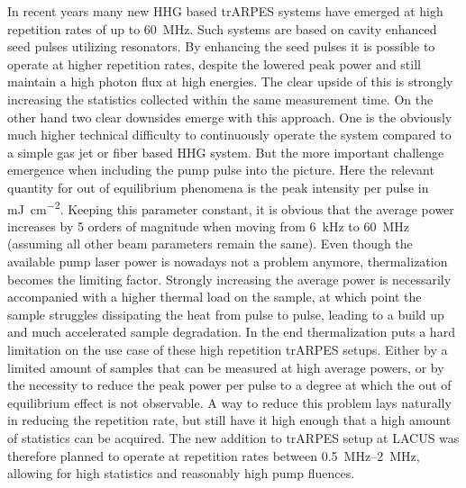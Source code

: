 In recent years many new HHG based trARPES systems have emerged at high repetition rates of up to \qty{60}{\mega\hertz}.
Such systems are based on cavity enhanced seed pulses utilizing resonators.
By enhancing the seed pulses it is possible to operate at higher repetition rates, despite the lowered peak power and still maintain a high photon flux at high energies.
The clear upside of this is strongly increasing the statistics collected within the same measurement time.
On the other hand two clear downsides emerge with this approach.
One is the obviously much higher technical difficulty to continuously operate the system compared to a simple gas jet or fiber based HHG system.
But the more important challenge emergence when including the pump pulse into the picture.
Here the relevant quantity for out of equilibrium phenomena is the peak intensity per pulse in \unit{\milli\joule\per\centi\meter^2}.
Keeping this parameter constant, it is obvious that the average power increases by 5 orders of magnitude when moving from \qty{6}{\kilo\hertz} to \qty{60}{\mega\hertz} (assuming all other beam parameters remain the same).
Even though the available pump laser power is nowadays not a problem anymore, thermalization becomes the limiting factor.
Strongly increasing the average power is necessarily accompanied with a higher thermal load on the sample, at which point the sample struggles dissipating the heat from pulse to pulse, leading to a build up and much accelerated sample degradation.
In the end thermalization puts a hard limitation on the use case of these high repetition trARPES setups.
Either by a limited amount of samples that can be measured at high average powers, or by the necessity to reduce the peak power per pulse to a degree at which the out of equilibrium effect is not observable.
A way to reduce this problem lays naturally in reducing the repetition rate, but still have it high enough that a high amount of statistics can be acquired.
The new addition to trARPES setup at LACUS was therefore planned to operate at repetition rates between \qtyrange{0.5}{2}{\mega\hertz}, allowing for high statistics and reasonably high pump fluences.

